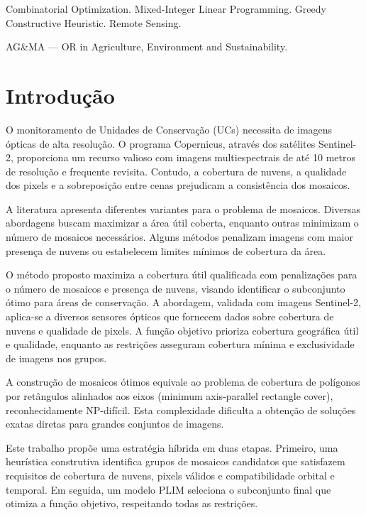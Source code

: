 \documentclass[a4paper,11pt]{article}
\begin{document}
\bigskip
\begin{keywords}
    Combinatorial Optimization. Mixed-Integer Linear Programming. Greedy Constructive Heuristic. Remote Sensing.

\bigskip
    AG\&MA --- OR in Agriculture, Environment and Sustainability.
\end{keywords}

\newpage

\section{Introdução}

O monitoramento de Unidades de Conservação (UCs) necessita de imagens ópticas de alta resolução. O programa Copernicus, através dos satélites Sentinel-2, proporciona um recurso valioso com imagens multiespectrais de até 10 metros de resolução e frequente revisita. Contudo, a cobertura de nuvens, a qualidade dos pixels e a sobreposição entre cenas prejudicam a consistência dos mosaicos.

A literatura apresenta diferentes variantes para o problema de mosaicos. Diversas abordagens buscam maximizar a área útil coberta, enquanto outras minimizam o número de mosaicos necessários. Alguns métodos penalizam imagens com maior presença de nuvens ou estabelecem limites mínimos de cobertura da área.

O método proposto maximiza a cobertura útil qualificada com penalizações para o número de mosaicos e presença de nuvens, visando identificar o subconjunto ótimo para áreas de conservação. A abordagem, validada com imagens Sentinel-2, aplica-se a diversos sensores ópticos que fornecem dados sobre cobertura de nuvens e qualidade de pixels. A função objetivo prioriza cobertura geográfica útil e qualidade, enquanto as restrições asseguram cobertura mínima e exclusividade de imagens nos grupos.

A construção de mosaicos ótimos equivale ao problema de cobertura de polígonos por retângulos alinhados aos eixos (minimum axis-parallel rectangle cover), reconhecidamente NP-difícil. Esta complexidade dificulta a obtenção de soluções exatas diretas para grandes conjuntos de imagens.

Este trabalho propõe uma estratégia híbrida em duas etapas. Primeiro, uma heurística construtiva identifica grupos de mosaicos candidatos que satisfazem requisitos de cobertura de nuvens, pixels válidos e compatibilidade orbital e temporal. Em seguida, um modelo PLIM seleciona o subconjunto final que otimiza a função objetivo, respeitando todas as restrições.
\end{document}
